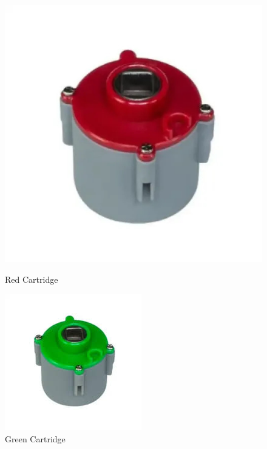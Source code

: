 \begin{figure}[hbt] %
    \begin{minipage}{.5\textwidth}
        \centering
        \includegraphics[width=.8\linewidth]{images/Red-Cartridge.png}
        \caption{Red Cartridge}
        \label{fig:red-cartridge}
    \end{minipage}%
    \begin{minipage}{.5\textwidth}
        \centering
        \includegraphics[width=.8\linewidth]{images/Green Cartridge.jpg}
        \caption{Green Cartridge}
        \label{fig:green-cartridge}

\end{minipage}
\end{figure}
